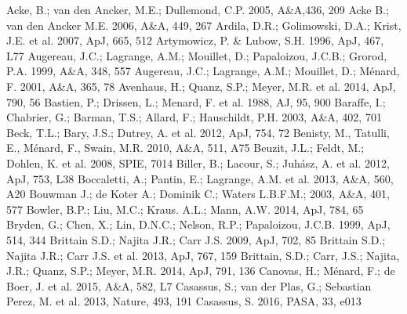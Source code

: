 \documentclass{aa}
\begin{document}
\begin{thebibliography}{}
 Acke, B.; van den Ancker, M.E.; Dullemond, C.P. 2005, A\&A,436, 209
 Acke B.; van den Ancker M.E. 2006, A\&A, 449, 267
 Ardila, D.R.; Golimowski, D.A.; Krist, J.E. et al. 2007, ApJ, 665, 512
 Artymowicz, P. \& Lubow, S.H. 1996, ApJ, 467, L77
 Augereau, J.C.; Lagrange, A.M.; Mouillet, D.; Papaloizou, J.C.B.; Grorod, P.A. 1999, A\&A, 348, 557
 Augereau, J.C.; Lagrange, A.M.; Mouillet, D.; M\'enard, F. 2001, A\&A, 365, 78
 Avenhaus, H.; Quanz, S.P.; Meyer, M.R. et al. 2014, ApJ, 790, 56
 Bastien, P.; Drissen, L.; Menard, F. et al. 1988, AJ, 95, 900
 Baraffe, I.; Chabrier, G.; Barman, T.S.; Allard, F.; Hauschildt, P.H. 2003, A\&A, 402, 701
 Beck, T.L.; Bary, J.S.; Dutrey, A. et al. 2012, ApJ, 754, 72
 Benisty, M., Tatulli, E., M\'enard, F., Swain, M.R. 2010, A\&A, 511, A75
 Beuzit, J.L.; Feldt, M.; Dohlen, K. et al. 2008, SPIE, 7014
 Biller, B.; Lacour, S.; Juh\'asz, A. et al. 2012, ApJ, 753, L38
 Boccaletti, A.; Pantin, E.; Lagrange, A.M. et al. 2013, A\&A, 560, A20
 Bouwman J.; de Koter A.; Dominik C.; Waters L.B.F.M.; 2003, A\&A, 401, 577
 Bowler, B.P.; Liu, M.C.; Kraus. A.L.; Mann, A.W. 2014, ApJ, 784, 65
 Bryden, G.; Chen, X.; Lin, D.N.C.; Nelson, R.P.; Papaloizou, J.C.B. 1999, ApJ, 514, 344
 Brittain S.D.; Najita J.R.; Carr J.S. 2009, ApJ, 702, 85
 Brittain S.D.; Najita J.R.; Carr J.S. et al. 2013, ApJ, 767, 159
 Brittain, S.D.; Carr, J.S.; Najita, J.R.; Quanz, S.P.; Meyer, M.R. 2014, ApJ, 791, 136
 Canovas, H.; Ménard, F.; de Boer, J. et al. 2015, A\&A, 582, L7 
 Casassus, S.; van der Plas, G.; Sebastian Perez, M. et al. 2013, Nature, 493, 191
 Casassus, S. 2016, PASA, 33, e013

\end{thebibliography}
\end{document}
